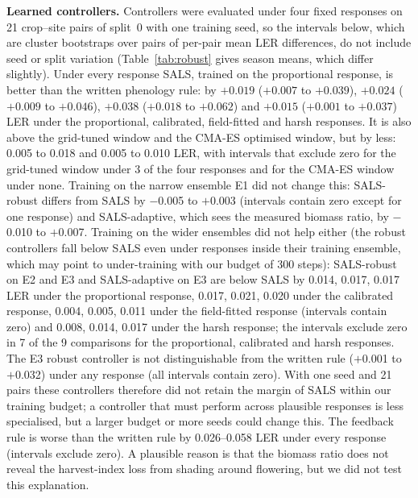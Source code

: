\textbf{Learned controllers.} Controllers were evaluated under four fixed responses on 21 crop--site pairs of split~0 with one training seed, so the intervals below, which are cluster bootstraps over pairs of per-pair mean LER differences, do not include seed or split variation (Table~\ref{tab:robust} gives season means, which differ slightly). Under every response SALS, trained on the proportional response, is better than the written phenology rule: by $+0.019$ ($+0.007$ to $+0.039$), $+0.024$ ($+0.009$ to $+0.046$), $+0.038$ ($+0.018$ to $+0.062$) and $+0.015$ ($+0.001$ to $+0.037$) LER under the proportional, calibrated, field-fitted and harsh responses. It is also above the grid-tuned window and the CMA-ES optimised window, but by less: 0.005 to 0.018 and 0.005 to 0.010 LER, with intervals that exclude zero for the grid-tuned window under 3 of the four responses and for the CMA-ES window under none. Training on the narrow ensemble E1 did not change this: SALS-robust differs from SALS by $-$0.005 to $+$0.003 (intervals contain zero except for one response) and SALS-adaptive, which sees the measured biomass ratio, by $-$0.010 to $+$0.007. Training on the wider ensembles did not help either (the robust controllers fall below SALS even under responses inside their training ensemble, which may point to under-training with our budget of 300 steps): SALS-robust on E2 and E3 and SALS-adaptive on E3 are below SALS by 0.014, 0.017, 0.017 LER under the proportional response, 0.017, 0.021, 0.020 under the calibrated response, 0.004, 0.005, 0.011 under the field-fitted response (intervals contain zero) and 0.008, 0.014, 0.017 under the harsh response; the intervals exclude zero in 7 of the 9 comparisons for the proportional, calibrated and harsh responses. The E3 robust controller is not distinguishable from the written rule ($+$0.001 to $+$0.032) under any response (all intervals contain zero). With one seed and 21 pairs these controllers therefore did not retain the margin of SALS within our training budget; a controller that must perform across plausible responses is less specialised, but a larger budget or more seeds could change this. The feedback rule is worse than the written rule by 0.026--0.058 LER under every response (intervals exclude zero). A plausible reason is that the biomass ratio does not reveal the harvest-index loss from shading around flowering, but we did not test this explanation.



